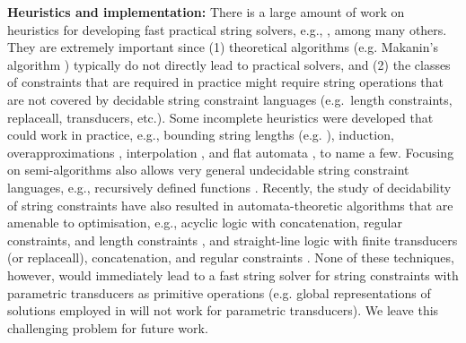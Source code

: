 


\smallskip
\noindent
\textbf{Heuristics and implementation:}
There is a large amount of work on heuristics for developing fast practical
string solvers, e.g., 
\cite{BTV09,Berkeley-JavaScript,HAMPI,Stranger,YABI14,Abdulla14,fang-yu-circuits,Abdulla17,HJLRV18,S3,TCJ16,Z3-str,Z3-str2,cvc4,Saner,RVG12},
among many others. They are extremely important since (1) theoretical algorithms
(e.g. Makanin's algorithm \cite{Makanin}) typically do not directly lead to 
practical solvers, and (2) the classes of constraints that are required in
practice might require string operations that are not covered by decidable
string constraint languages (e.g.~length constraints, replaceall, transducers,
etc.). Some incomplete heuristics were developed that could work in practice,
e.g., bounding string lengths (e.g. \cite{HAMPI,Berkeley-JavaScript,BTV09}), 
induction, overapproximations \cite{Stranger,YABI14}, interpolation
\cite{Abdulla14}, and flat automata \cite{Abdulla17}, to name a few. 
Focusing on semi-algorithms also allows very general undecidable string 
constraint languages, e.g., recursively defined functions \cite{S3,TCJ16}. 
Recently, the study of decidability of string constraints have also resulted in
automata-theoretic algorithms that are amenable to optimisation, e.g.,
acyclic logic with concatenation, regular constraints, and length constraints 
\cite{Abdulla14}, and straight-line logic with finite transducers (or
replaceall), concatenation, and regular constraints 
\cite{HJLRV18,fang-yu-circuits,yan-tool}. None of these techniques, however,
would immediately lead to a fast string solver for string constraints with 
parametric transducers as primitive operations (e.g. global representations
of solutions employed in \cite{HJLRV18} will not work for parametric
transducers). We leave this challenging problem for future work.

